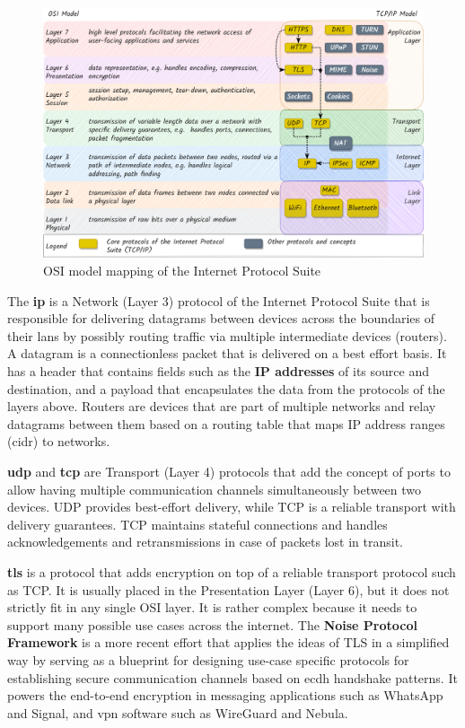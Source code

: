 \begin{figure}
\centering
\includegraphics[width=\textwidth,height=0.5\textheight]{thesis/../figures/osi-map-tcp.png}
\caption{OSI model mapping of the Internet Protocol
Suite\label{osi-map-tcp}}
\end{figure}

The \textbf{\acrfull{ip}} is a Network (Layer 3) protocol of the
Internet Protocol Suite that is responsible for delivering datagrams
between devices across the boundaries of their \glspl{lan} by possibly
routing traffic via multiple intermediate devices (routers). A datagram
is a connectionless packet that is delivered on a best effort basis. It
has a header that contains fields such as the \textbf{IP addresses} of
its source and destination, and a payload that encapsulates the data
from the protocols of the layers above. Routers are devices that are
part of multiple networks and relay datagrams between them based on a
routing table that maps IP address ranges (\gls{cidr}) to networks.

\textbf{\acrfull{udp}} and \textbf{\acrfull{tcp}} are Transport (Layer
4) protocols that add the concept of ports to allow having multiple
communication channels simultaneously between two devices. UDP provides
best-effort delivery, while TCP is a reliable transport with delivery
guarantees. TCP maintains stateful connections and handles
acknowledgements and retransmissions in case of packets lost in transit.

\textbf{\acrfull{tls}} is a protocol that adds encryption on top of a
reliable transport protocol such as TCP. It is usually placed in the
Presentation Layer (Layer 6), but it does not strictly fit in any single
OSI layer. It is rather complex because it needs to support many
possible use cases across the internet.  The \textbf{Noise
Protocol Framework} \autocite{noiseDocs} is a more
 recent effort that applies the
ideas of TLS in a simplified way by serving as a blueprint for designing
use-case specific protocols for establishing secure communication
channels based on \gls{ecdh} handshake patterns. It powers the
end-to-end encryption in messaging applications such as WhatsApp and
Signal, and \gls{vpn} software such as WireGuard and Nebula.

